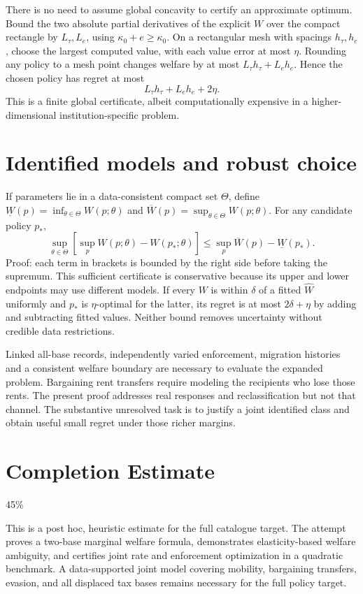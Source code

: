 \documentclass[11pt]{article}
\theoremstyle{definition}
\begin{document}
There is no need to assume global concavity to certify an approximate optimum.
Bound the two absolute partial derivatives of the explicit $W$ over the compact
rectangle by $L_\tau,L_e$, using $\kappa_0+e\ge\kappa_0$. On a rectangular
mesh with spacings $h_\tau,h_e$, choose the largest computed value, with each
value error at most $\eta$. Rounding any policy to a mesh point changes welfare
by at most $L_\tau h_\tau+L_e h_e$. Hence the chosen policy has regret at most
\[
 L_\tau h_\tau+L_e h_e+2\eta.                             \tag{5}
\]
This is a finite global certificate, albeit computationally expensive in a
higher-dimensional institution-specific problem.

\section*{Identified models and robust choice}
If parameters lie in a data-consistent compact set $\Theta$, define
$\underline W(p)=\inf_{\theta\in\Theta}W(p;\theta)$ and
$\overline W(p)=\sup_{\theta\in\Theta}W(p;\theta)$.
For any candidate policy $p_*$,
\[
 \sup_{\theta\in\Theta}
 [\sup_pW(p;\theta)-W(p_*;\theta)]
 \le\sup_p\overline W(p)-\underline W(p_*).              \tag{6}
\]
Proof: each term in brackets is bounded by the right side before taking the
supremum. This sufficient certificate is conservative because its upper and
lower endpoints may use different models. If every $W$ is within $\delta$ of
a fitted $\widehat W$ uniformly and $p_*$ is $\eta$-optimal for the latter,
its regret is at most $2\delta+\eta$ by adding and subtracting fitted values.
Neither bound removes uncertainty without credible data restrictions.

Linked all-base records, independently varied enforcement, migration histories
and a consistent welfare boundary are necessary to evaluate the expanded
problem. Bargaining rent transfers require modeling the recipients who lose
those rents. The present proof addresses real responses and reclassification
but not that channel. The substantive unresolved task is to justify a joint
identified class and obtain useful small regret under those richer margins.

\section{Completion Estimate}
45\%

This is a post hoc, heuristic estimate for the full catalogue target.
The attempt proves a two-base marginal welfare formula, demonstrates elasticity-based welfare ambiguity, and certifies joint rate and enforcement optimization in a quadratic benchmark. A data-supported joint model covering mobility, bargaining transfers, evasion, and all displaced tax bases remains necessary for the full policy target.
\end{document}
